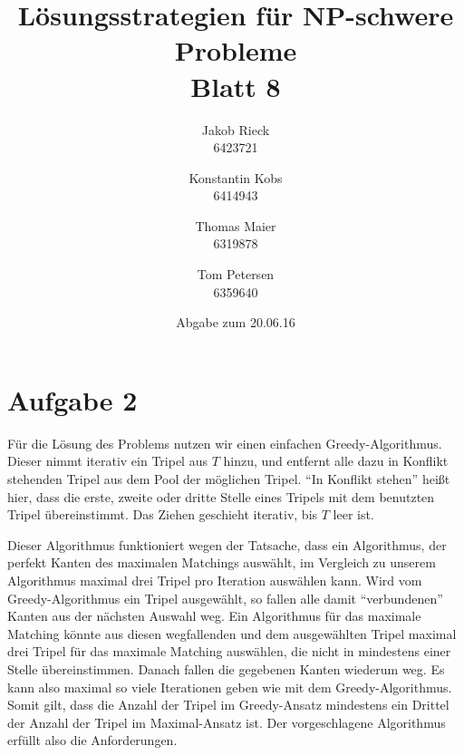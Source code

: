 \documentclass[12pt,a4paper]{article}
\title{Lösungsstrategien für NP-schwere Probleme\\Blatt 8}
\author{
		Jakob Rieck\\
		\small{6423721}
	\and
		Konstantin Kobs\\
		\small{6414943}
	\and
		Thomas Maier\\
		\small{6319878}
	\and
		Tom Petersen\\
		\small{6359640}
}
\date{Abgabe zum 20.06.16}
\begin{document}
\maketitle

\section*{Aufgabe 2}

Für die Lösung des Problems nutzen wir einen einfachen Greedy-Algorithmus. Dieser nimmt iterativ ein Tripel aus $T$ hinzu, und entfernt alle dazu in Konflikt stehenden Tripel aus dem Pool der möglichen Tripel. "`In Konflikt stehen"' heißt hier, dass die erste, zweite oder dritte Stelle eines Tripels mit dem benutzten Tripel übereinstimmt. Das Ziehen geschieht iterativ, bis $T$ leer ist. 

Dieser Algorithmus funktioniert wegen der Tatsache, dass ein Algorithmus, der perfekt Kanten des maximalen Matchings auswählt, im Vergleich zu unserem Algorithmus maximal drei Tripel pro Iteration auswählen kann. Wird vom Greedy-Algorithmus ein Tripel ausgewählt, so fallen alle damit "`verbundenen"' Kanten aus der nächsten Auswahl weg. Ein Algorithmus für das maximale Matching könnte aus diesen wegfallenden und dem ausgewählten Tripel maximal drei Tripel für das maximale Matching auswählen, die nicht in mindestens einer Stelle übereinstimmen. Danach fallen die gegebenen Kanten wiederum weg. Es kann also maximal so viele Iterationen geben wie mit dem Greedy-Algorithmus. Somit gilt, dass die Anzahl der Tripel im Greedy-Ansatz mindestens ein Drittel der Anzahl der Tripel im Maximal-Ansatz ist. Der vorgeschlagene Algorithmus erfüllt also die Anforderungen.
\end{document}
